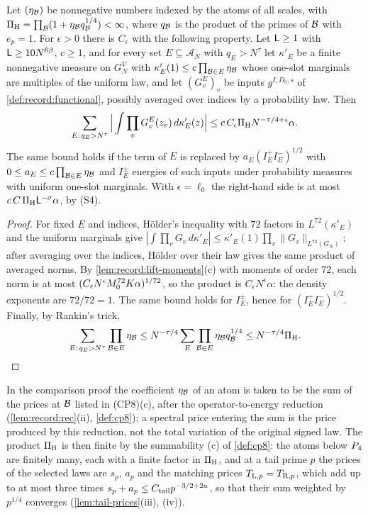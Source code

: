 \begin{lemma}
\label{lem:record:density-lp}
Let $(\eta_\mathcal B)$ be nonnegative numbers indexed by the atoms of all scales,
with $\Pi_{\rm H}=\prod_\mathcal B(1+\eta_\mathcal B q_\mathcal B^{1/4})<\infty$, where $q_\mathcal B$
is the product of the primes of $\mathcal B$ with $e_p=1$. For $\epsilon>0$ there is
$C_\epsilon$ with the following property. Let $\mathsf L\ge1$ with
$\mathsf L\ge10N^{6\beta}$, $c\ge1$, and for every set $E\subseteq\mathcal A_N$
with $q_E>N^\tau$ let $\kappa'_E$ be a finite nonnegative measure on $G_N^V$
with $\kappa'_E(1)\le c\prod_{\mathcal B\in E}\eta_\mathcal B$ whose one-slot marginals are
multiples of the uniform law, and let $(G^E_v)_v$ be inputs
$g^{I,D_0,s}$ of \cref{def:record:functional}, possibly averaged over indices
by a probability law. Then
\[
 \sum_{E:\,q_E>N^\tau}\Big|\int\prod_vG^E_v(z_v)\,d\kappa'_E(z)\Big|
 \le c\,C_\epsilon\Pi_{\rm H}N^{-\tau/4+\epsilon}\alpha .
\]
The same bound holds if the term of $E$ is replaced by
$a_E(I_E^+I_E^-)^{1/2}$ with $0\le a_E\le c\prod_{\mathcal B\in E}\eta_\mathcal B$ and
$I_E^\pm$ energies of such inputs under probability measures with uniform
one-slot marginals. With $\epsilon=\ell_0$ the right-hand side is at most
$c\,C\,\Pi_{\rm H}\mathsf L^{-\sigma}\alpha$, by (S4).
\end{lemma}

\begin{proof}
For fixed $E$ and indices, H\"older's inequality with $72$ factors in
$L^{72}(\kappa'_E)$ and the uniform marginals give
$|\int\prod_vG_v\,d\kappa'_E|\le\kappa'_E(1)\prod_v\|G_v\|_{L^{72}(G_N)}$; after
averaging over the indices, H\"older over their law gives the same product of
averaged norms. By \cref{lem:record:lift-moments}(c) with moments of order $72$,
each norm is at most $(C_\epsilon N^\epsilon M_0^{72}K\alpha)^{1/72}$, so
the product is $C_\epsilon N^\epsilon\alpha$: the density exponents are
$72/72=1$. The same bound holds for $I_E^\pm$, hence for $(I_E^+I_E^-)^{1/2}$.
Finally, by Rankin's trick,
\[
 \sum_{E:\,q_E>N^\tau}\prod_{\mathcal B\in E}\eta_\mathcal B\le N^{-\tau/4}\sum_E
 \prod_{\mathcal B\in E}\eta_\mathcal B q_\mathcal B^{1/4}\le N^{-\tau/4}\Pi_{\rm H}.
\]
\end{proof}

In the comparison proof the coefficient $\eta_\mathcal B$ of an atom
is taken to be the sum of the prices at $\mathcal B$ listed in
(CP8)(c), after the operator-to-energy reduction
(\cref{lem:record:rec}(ii), \cref{def:cp8}); a spectral price entering
the sum is the price produced by this reduction, not the total variation
of the original signed law. The product
$\Pi_{\rm H}$ is then finite by the summability (c) of \cref{def:cp8}: the
atoms below $P_4$ are finitely many, each with a finite factor in
$\Pi_{\rm H}$, and at a tail prime $p$ the prices of the selected laws are
$s_p$, $a_p$ and the matching prices $T_{{\rm L},p}=T_{{\rm R},p}$, which
add up to at most three times $s_p+a_p\le C_{\rm tail}p^{-3/2+2a}$, so that
their sum weighted by $p^{1/4}$ converges (\cref{lem:tail-prices}(iii),
(iv)).

